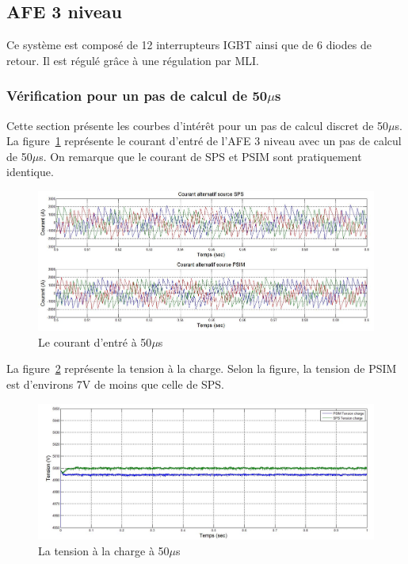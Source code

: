 \documentclass[11pt,letterpaper,final]{report}
\begin{document}
\clearpage
\subsection{AFE 3 niveau}
Ce système est composé de 12 interrupteurs IGBT ainsi que de 6 diodes de retour. Il est régulé grâce à une régulation par MLI.

\subsubsection{Vérification pour un pas de calcul de 50$\mu$s}
Cette section présente les courbes d'intérêt pour un pas de calcul discret de 50$\mu$s. La figure~\ref{AF_3_cou50} représente le courant d'entré de l'AFE 3 niveau avec un pas de calcul de 50$\mu$s. On remarque que le courant de SPS et PSIM sont pratiquement identique. 

\begin{figure}[htb]
\centering
\includegraphics[scale=0.5]{Fig/AFE3LEVEL/50u/cour_al.jpg}
\caption{Le courant d'entré à 50$\mu$s}
\label{AF_3_cou50}
\end{figure}

La figure~\ref{AF_3_vch50} représente la tension à la charge. Selon la figure, la tension de PSIM est d'environs 7V de moins que celle de SPS.
\begin{figure}[htb]
\centering
\includegraphics[scale=0.5]{Fig/AFE3LEVEL/50u/vch.jpg}
\caption{La tension à la charge à 50$\mu$s}
\label{AF_3_vch50}
\end{figure}
\end{document}

